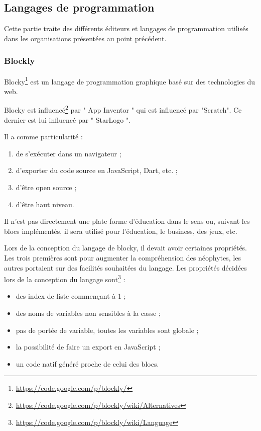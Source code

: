 \subsection{Langages de programmation}
Cette partie traite des différents éditeurs et langages de programmation utilisés dans les organisations présentées au point précédent.
\subsubsection{Blockly}
\label{blockly}
Blocky\footnote{\url{https://code.google.com/p/blockly/}} est un langage de programmation graphique basé sur des technologies du web. 

Blocky est influencé\footnote{\url{https://code.google.com/p/blockly/wiki/Alternatives}} par " App Inventor " qui est influencé par "Scratch". Ce dernier est lui influencé par " StarLogo ".

Il a comme particularité :
\begin{enumerate}
\item de s'exécuter dans un navigateur ;
\item d'exporter du code source en JavaScript, Dart, etc. ;
\item d'être open source ;
\item d'être haut niveau.
\end{enumerate}

Il n'est pas directement une plate forme d'éducation dans le sens ou, suivant les blocs implémentés, il sera utilisé pour l'éducation, le business, des jeux, etc.

Lors de la conception du langage de blocky, il devait avoir certaines propriétés. Les trois premières sont pour augmenter la compréhension des néophytes, les autres portaient sur des facilités souhaitées du langage. Les propriétés décidées lors de la conception du langage sont\footnote{\url{https://code.google.com/p/blockly/wiki/Language}} :

\begin{itemize}
  \item des index de liste commençant à 1 ;
  \item des noms de variables non sensibles à la casse ;
  \item pas de portée de variable, toutes les variables sont globale ;
  \item la possibilité de faire un export en JavaScript ;
  \item un code natif généré proche de celui des blocs.
\end{itemize}

